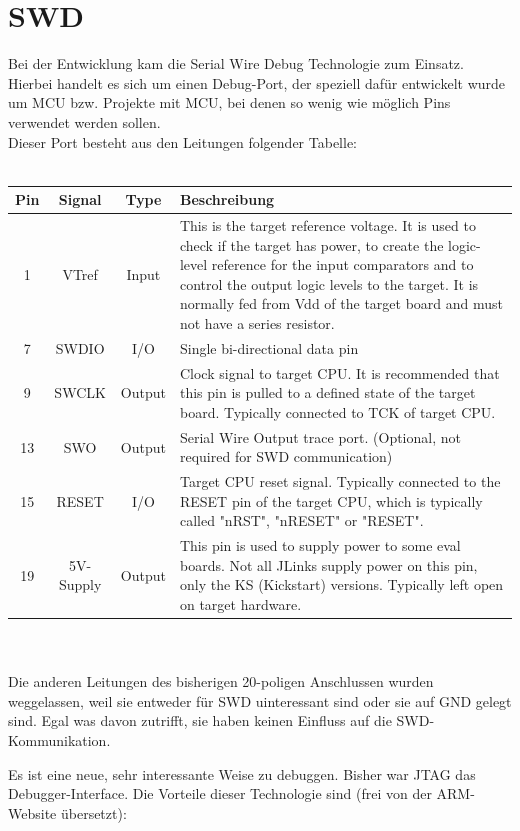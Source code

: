 \section{SWD}
Bei der Entwicklung kam die Serial Wire Debug Technologie zum Einsatz. Hierbei 
handelt es sich um einen Debug-Port, der speziell daf\"ur entwickelt wurde
 um MCU bzw. Projekte mit MCU, bei denen so wenig wie m\"oglich Pins verwendet
 werden sollen. \\
Dieser Port besteht aus den Leitungen folgender Tabelle:\\\\
\begin{tabular}{|c|c|c|p{10cm}|}
\hline \hline
	Pin & Signal & Type & Beschreibung \\ \hline
1 & VTref & Input & This is the target reference voltage. It is used to
 check if the target has power, to create the logic-level reference for
 the input comparators and to control the output logic levels to the target.
 It is normally fed from Vdd of the target board and must not have a series resistor.\\ \hline
7 & SWDIO & I/O & Single bi-directional data pin\\ \hline
9 & SWCLK & Output & Clock signal to target CPU. It is recommended that
 this pin is pulled to a defined state of the target board. Typically
 connected to TCK of target CPU.\\ \hline
13 & SWO & Output & Serial Wire Output trace port. (Optional, not required
for SWD communication)\\ \hline
15 & RESET & I/O & Target CPU reset signal. Typically connected to the
 RESET pin of the target CPU, which is typically called "nRST", "nRESET"
 or "RESET".\\ \hline
19 & 5V-Supply & Output & This pin is used to supply power to some eval boards.
Not all JLinks supply power on this pin, only the KS (Kickstart) versions.
Typically left open on target hardware.\\ \hline
\end{tabular}\\\\

Die anderen Leitungen des bisherigen 20-poligen Anschlussen wurden weggelassen,
weil sie entweder f\"ur SWD uinteressant sind oder sie auf GND gelegt sind. Egal
was davon zutrifft, sie haben keinen Einfluss auf die SWD-Kommunikation.

Es ist eine neue, sehr interessante Weise zu debuggen. Bisher war JTAG das
Debugger-Interface. 
Die Vorteile dieser Technologie sind (frei von der ARM-Website \"ubersetzt):

